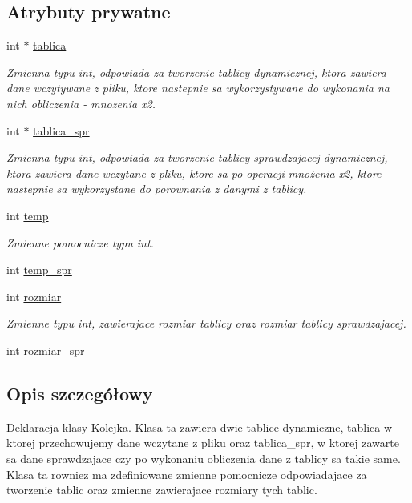 \subsection*{\-Atrybuty prywatne}
\begin{DoxyCompactItemize}
\item 
int $\ast$ \hyperlink{class_dane_a094084ea03dd13bb92c8a8eb7d4e7888}{tablica}
\begin{DoxyCompactList}\small\item\em \-Zmienna typu int, odpowiada za tworzenie tablicy dynamicznej, ktora zawiera dane wczytywane z pliku, ktore nastepnie sa wykorzystywane do wykonania na nich obliczenia -\/ mnozenia x2. \end{DoxyCompactList}\item 
int $\ast$ \hyperlink{class_dane_a394973f4dcbc75d3e218ef2a31bc99f9}{tablica\-\_\-spr}
\begin{DoxyCompactList}\small\item\em \-Zmienna typu int, odpowiada za tworzenie tablicy sprawdzajacej dynamicznej, ktora zawiera dane wczytane z pliku, ktore sa po operacji mnożenia x2, ktore nastepnie sa wykorzystane do porownania z danymi z tablicy. \end{DoxyCompactList}\item 
int \hyperlink{class_dane_a4f2d205b1c49da1f5f289a97139d4f6d}{temp}
\begin{DoxyCompactList}\small\item\em \-Zmienne pomocnicze typu int. \end{DoxyCompactList}\item 
int \hyperlink{class_dane_a98c7a87fc812e3d3b41e4cb9ee7b105f}{temp\-\_\-spr}
\item 
int \hyperlink{class_dane_afe0ec9a05ba6720f9a14c96bbec2c7dd}{rozmiar}
\begin{DoxyCompactList}\small\item\em \-Zmienne typu int, zawierajace rozmiar tablicy oraz rozmiar tablicy sprawdzajacej. \end{DoxyCompactList}\item 
int \hyperlink{class_dane_ab9731edece0d6a357594c7cd02985dab}{rozmiar\-\_\-spr}
\end{DoxyCompactItemize}


\subsection{\-Opis szczegółowy}
\-Deklaracja klasy \-Kolejka. \-Klasa ta zawiera dwie tablice dynamiczne, tablica w ktorej przechowujemy dane wczytane z pliku oraz tablica\-\_\-spr, w ktorej zawarte sa dane sprawdzajace czy po wykonaniu obliczenia dane z tablicy sa takie same. \-Klasa ta rowniez ma zdefiniowane zmienne pomocnicze odpowiadajace za tworzenie tablic oraz zmienne zawierajace rozmiary tych tablic. 

